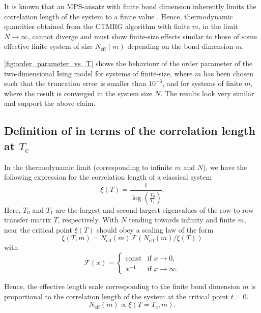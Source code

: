 It is known that an MPS-ansatz with finite bond dimension inherently limits the
correlation length of the system to a finite value \cite{wolf2006quantum}. Hence,
thermodynamic quantities obtained from the CTMRG algorithm with finite $m$, in the limit
$N \to \infty$, cannot diverge and must show finite-size effects similar to those of some
effective finite system of size $N_{\text{eff}}(m)$ depending on the bond dimension $m$.

\autoref{fig:order_parameter_vs_T} shows the behaviour of the order parameter of the
two-dimensional Ising model for systems of finite-size, where $m$ has been chosen such
that the truncation error is smaller than $10^{-6}$, and for systems of finite $m$, where
the result is converged in the system size $N$. The results look very similar and support
the above claim.


\subsection{Definition of  in terms of the correlation length at $T_c$}

In the thermodynamic limit (corresponding to infinite $m$ and $N$), we have the following
expression for the correlation length of a classical system
\cite{baxter1982exactly_correlation_length}
\begin{equation}
  \xi(T) = \frac{1}{\log\left(\frac{T_0}{T_1}\right)}.
\end{equation}
Here, $T_0$ and $T_1$ are the largest and second-largest eigenvalues of the row-to-row
transfer matrix $T$, respectively. With $N$ tending towards infinity and finite $m$, near
the critical point $\xi(T)$ should obey a scaling law of the form
\begin{equation}
  \xi(T, m) = N_{\text{eff}}(m) \mathcal{F}(N_{\text{eff}}(m) / \xi(T))
\end{equation}
with
\begin{equation}
  \mathcal{F}(x) = \begin{cases}
      \text{const} & \text{if } x \to 0, \\
      x^{-1} & \text{if } x \to \infty.
    \end{cases}
\end{equation}

Hence, the effective length scale corresponding to the finite bond dimension $m$ is
proportional to the correlation length of the system at the critical point $t = 0$.
\begin{equation}
  N_{\text{eff}}(m) \propto \xi(T = T_c, m).
\end{equation}

